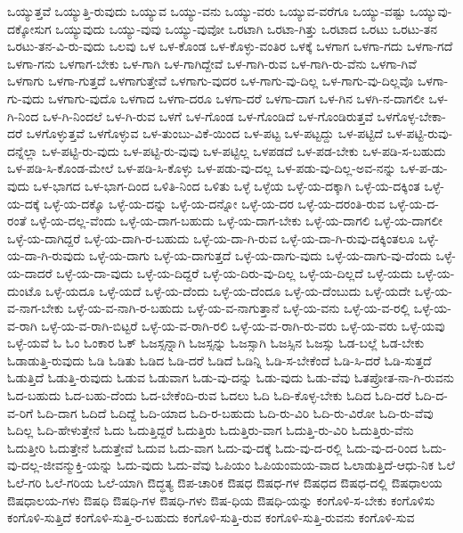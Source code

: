 {ಒಯ್ಯುತ್ತವೆ
ಒಯ್ಯುತ್ತಿ-ರುವುದು
ಒಯ್ಯುವ
ಒಯ್ಯು-ವನು
ಒಯ್ಯು-ವರು
ಒಯ್ಯುವ-ವರೆಗೂ
ಒಯ್ಯು-ವಷ್ಟು
ಒಯ್ಯುವು-ದಕ್ಕೋಸುಗ
ಒಯ್ಯುವುದು
ಒಯ್ಯು-ವುವು
ಒಯ್ಯು-ವುವೋ
ಒರಟಾಗಿ
ಒರಟಾ-ಗಿತ್ತು
ಒರಟಾದ
ಒರಟು
ಒರಟು-ತನ
ಒರಟು-ತನ-ವಿ-ರು-ವುದು
ಒಲವು
ಒಳ
ಒಳ-ಕೊಂಡ
ಒಳ-ಕೊಳ್ಳು-ವಂತಿರ
ಒಳಕ್ಕೆ
ಒಳಗಾಗ
ಒಳಗಾ-ಗದು
ಒಳಗಾ-ಗದೆ
ಒಳಗಾ-ಗನು
ಒಳಗಾಗ-ಬೇಕು
ಒಳ-ಗಾಗಿ
ಒಳ-ಗಾಗಿದ್ದೇವೆ
ಒಳ-ಗಾಗಿ-ರುವ
ಒಳ-ಗಾಗಿ-ರು-ವೆನು
ಒಳಗಾ-ಗಿವೆ
ಒಳಗಾಗು
ಒಳಗಾ-ಗುತ್ತದೆ
ಒಳಗಾಗುತ್ತೇವೆ
ಒಳಗಾಗು-ವುದರ
ಒಳ-ಗಾಗು-ವು-ದಿಲ್ಲ
ಒಳ-ಗಾಗು-ವು-ದಿಲ್ಲವೊ
ಒಳಗಾ-ಗು-ವುದು
ಒಳಗಾಗು-ವುದೊ
ಒಳಗಾದ
ಒಳಗಾ-ದರೂ
ಒಳಗಾ-ದರೆ
ಒಳಗಾ-ದಾಗ
ಒಳ-ಗಿನ
ಒಳಗಿ-ನ-ದಾಗಲೀ
ಒಳ-ಗಿ-ನಿಂದ
ಒಳ-ಗಿ-ನಿಂದಲೆ
ಒಳ-ಗಿ-ರುವ
ಒಳಗೆ
ಒಳ-ಗೊಂಡ
ಒಳ-ಗೊಂಡಿದೆ
ಒಳ-ಗೊಂಡಿರುತ್ತವೆ
ಒಳಗೊಳ್ಳ-ಬೇಕಾ-ದರೆ
ಒಳಗೊಳ್ಳುತ್ತವೆ
ಒಳಗೊಳ್ಳುವ
ಒಳ-ತುಂಬು-ವಿಕೆ-ಯಿಂದ
ಒಳ-ಪಟ್ಟ
ಒಳ-ಪಟ್ಟದ್ದು
ಒಳ-ಪಟ್ಟಿದೆ
ಒಳ-ಪಟ್ಟಿ-ರುವು-ದನ್ನೆಲ್ಲಾ
ಒಳ-ಪಟ್ಟಿ-ರು-ವುದು
ಒಳ-ಪಟ್ಟಿ-ರು-ವುವು
ಒಳ-ಪಟ್ಟಿಲ್ಲ
ಒಳಪಡದೆ
ಒಳ-ಪಡ-ಬೇಕು
ಒಳ-ಪಡಿ-ಸ-ಬಹುದು
ಒಳ-ಪಡಿ-ಸಿ-ಕೊಂಡ-ಮೇಲೆ
ಒಳ-ಪಡಿ-ಸಿ-ಕೊಳ್ಳು
ಒಳ-ಪಡು-ವು-ದಲ್ಲ
ಒಳ-ಪಡು-ವು-ದಿಲ್ಲ-ಅವ-ನನ್ನು
ಒಳ-ಪ-ಡು-ವುದು
ಒಳ-ಭಾಗದ
ಒಳ-ಭಾಗ-ದಿಂದ
ಒಳಿತಿ-ನಿಂದ
ಒಳಿತು
ಒಳ್ಳೆ
ಒಳ್ಳೆಯ
ಒಳ್ಳೆ-ಯ-ದಕ್ಕಾಗಿ
ಒಳ್ಳೆ-ಯ-ದಕ್ಕಿಂತ
ಒಳ್ಳೆ-ಯ-ದಕ್ಕೆ
ಒಳ್ಳೆ-ಯ-ದಕ್ಕೊ
ಒಳ್ಳೆ-ಯ-ದನ್ನು
ಒಳ್ಳೆ-ಯ-ದನ್ನೋ
ಒಳ್ಳೆ-ಯ-ದರ
ಒಳ್ಳೆ-ಯ-ದರಂತಿ-ರುವ
ಒಳ್ಳೆ-ಯ-ದ-ರಂತೆ
ಒಳ್ಳೆ-ಯ-ದಲ್ಲ-ವೆಂದು
ಒಳ್ಳೆ-ಯ-ದಾಗ-ಬಹುದು
ಒಳ್ಳೆ-ಯ-ದಾಗ-ಬೇಕು
ಒಳ್ಳೆ-ಯ-ದಾಗಲಿ
ಒಳ್ಳೆ-ಯ-ದಾಗಲೀ
ಒಳ್ಳೆ-ಯ-ದಾಗಿದ್ದರೆ
ಒಳ್ಳೆ-ಯ-ದಾಗಿ-ರ-ಬಹುದು
ಒಳ್ಳೆ-ಯ-ದಾ-ಗಿ-ರುವ
ಒಳ್ಳೆ-ಯ-ದಾ-ಗಿ-ರುವು-ದಕ್ಕಿಂತಲೂ
ಒಳ್ಳೆ-ಯ-ದಾ-ಗಿ-ರುವುದು
ಒಳ್ಳೆ-ಯ-ದಾಗು
ಒಳ್ಳೆ-ಯ-ದಾಗುತ್ತದೆ
ಒಳ್ಳೆ-ಯ-ದಾಗು-ವುದು
ಒಳ್ಳೆ-ಯ-ದಾಗು-ವು-ದೆಂದು
ಒಳ್ಳೆ-ಯ-ದಾದರೆ
ಒಳ್ಳೆ-ಯ-ದಾ-ವುದು
ಒಳ್ಳೆ-ಯ-ದಿದ್ದರೆ
ಒಳ್ಳೆ-ಯ-ದಿರು-ವು-ದಿಲ್ಲ
ಒಳ್ಳೆ-ಯ-ದಿಲ್ಲದೆ
ಒಳ್ಳೆ-ಯದು
ಒಳ್ಳೆ-ಯ-ದುಂಟೊ
ಒಳ್ಳೆ-ಯದೂ
ಒಳ್ಳೆ-ಯದೆ
ಒಳ್ಳೆ-ಯ-ದೆಂದು
ಒಳ್ಳೆ-ಯ-ದೆಂದೂ
ಒಳ್ಳೆ-ಯ-ದೆಂಬುದು
ಒಳ್ಳೆ-ಯದೇ
ಒಳ್ಳೆ-ಯ-ವ-ನಾಗ-ಬೇಕು
ಒಳ್ಳೆ-ಯ-ವ-ನಾಗಿ-ರ-ಬಹುದು
ಒಳ್ಳೆ-ಯ-ವ-ನಾಗುತ್ತಾನೆ
ಒಳ್ಳೆ-ಯ-ವನು
ಒಳ್ಳೆ-ಯ-ವ-ರಲ್ಲಿ
ಒಳ್ಳೆ-ಯ-ವ-ರಾಗಿ
ಒಳ್ಳೆ-ಯ-ವ-ರಾಗಿ-ಬಿಟ್ಟರೆ
ಒಳ್ಳೆ-ಯ-ವ-ರಾಗಿ-ರಲಿ
ಒಳ್ಳೆ-ಯ-ವ-ರಾಗಿ-ರು-ವರು
ಒಳ್ಳೆ-ಯ-ವರು
ಒಳ್ಳೆ-ಯವು
ಒಳ್ಳೆ-ಯವೆ
ಓ
ಓಂ
ಓಂಕಾರ
ಓಕ್
ಓಜಸ್ಸನ್ನಾಗಿ
ಓಜಸ್ಸನ್ನು
ಓಜಸ್ಸಾಗಿ
ಓಜಸ್ಸಿನ
ಓಜಸ್ಸು
ಓಡ-ಬಲ್ಲೆ
ಓಡ-ಬೇಕು
ಓಡಾಡುತ್ತಿ-ರುವುದು
ಓಡಿ
ಓಡಿತು
ಓಡಿದ
ಓಡಿ-ದರೆ
ಓಡಿದೆ
ಓಡಿನ್ನಿ
ಓಡಿ-ಸ-ಬೇಕೆಂದೆ
ಓಡಿ-ಸಿ-ದರೆ
ಓಡಿ-ಸುತ್ತದೆ
ಓಡುತ್ತಿದೆ
ಓಡುತ್ತಿ-ರುವುದು
ಓಡುವ
ಓಡುವಾಗ
ಓಡು-ವು-ದನ್ನು
ಓಡು-ವುದು
ಓಡು-ವೆವು
ಓತಪ್ರೋತ-ನಾ-ಗಿ-ರುವನು
ಓದ-ಬಹುದು
ಓದ-ಬಹು-ದೆಂದು
ಓದ-ಬೇಕೆಂದಿ-ರುವ
ಓದಲು
ಓದಿ
ಓದಿ-ಕೊಳ್ಳ-ಬೇಕು
ಓದಿದ
ಓದಿ-ದರೆ
ಓದಿ-ದ-ವ-ರಿಗೆ
ಓದಿ-ದಾಗ
ಓದಿದೆ
ಓದಿದ್ದೆ
ಓದಿ-ಯಾದ
ಓದಿ-ರ-ಬಹುದು
ಓದಿ-ರು-ವಿರಿ
ಓದಿ-ರು-ವಿರೋ
ಓದಿ-ರು-ವೆವು
ಓದಿಲ್ಲ
ಓದಿ-ಹೇಳುತ್ತೇನೆ
ಓದು
ಓದುತ್ತಿದ್ದರೆ
ಓದುತ್ತಿರು
ಓದುತ್ತಿರು-ವಾಗ
ಓದುತ್ತಿ-ರು-ವಿರಿ
ಓದುತ್ತಿರು-ವೆನು
ಓದುತ್ತೀರಿ
ಓದುತ್ತೇನೆ
ಓದುತ್ತೇವೆ
ಓದುವ
ಓದು-ವಾಗ
ಓದು-ವು-ದಕ್ಕೆ
ಓದು-ವು-ದ-ರಲ್ಲಿ
ಓದು-ವು-ದ-ರಿಂದ
ಓದು-ವು-ದಲ್ಲ-ಜೀವನ್ಮುಕ್ತಿ-ಯನ್ನು
ಓದು-ವುದು
ಓದು-ವೆವು
ಓಪಿಯಂ
ಓಪಿಯಂಮಯ-ವಾದ
ಓಲಾಡುತ್ತಿದೆ-ಆಧು-ನಿಕ
ಓಲೆ
ಓಲೆ-ಗರಿ
ಓಲೆ-ಗರಿಯ
ಓಲೆ-ಯಾಗಿ
ಔದ್ಧತ್ಯ
ಔಪ-ಚಾರಿಕ
ಔಷಧ
ಔಷಧ-ಗಳ
ಔಷಧದ
ಔಷಧ-ದಲ್ಲಿ
ಔಷಧಾಲಯ
ಔಷಧಾಲಯ-ಗಳು
ಔಷಧಿ
ಔಷಧಿ-ಗಳ
ಔಷಧಿ-ಗಳು
ಔಷ-ಧಿಯ
ಔಷಧಿ-ಯನ್ನು
ಕಂಗೊಳಿ-ಸ-ಬೇಕು
ಕಂಗೊಳಿಸು
ಕಂಗೊಳಿ-ಸುತ್ತಿದೆ
ಕಂಗೊಳಿ-ಸುತ್ತಿ-ರ-ಬಹುದು
ಕಂಗೊಳಿ-ಸುತ್ತಿ-ರುವ
ಕಂಗೊಳಿ-ಸುತ್ತಿ-ರುವನು
ಕಂಗೊಳಿ-ಸುವ
}
